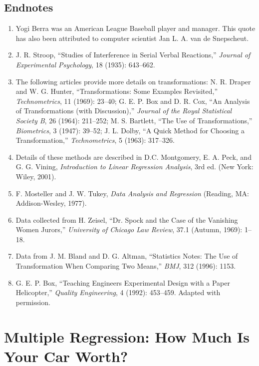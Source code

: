 \documentclass[
]{report}
\begin{document}
\section*{\texorpdfstring{\textbf{Endnotes}}{Endnotes}}\label{endnotes}

\begin{enumerate}
  \item Yogi Berra was an American League Baseball player and manager. This quote has also been attributed to computer scientist Jan L. A. van de Snepscheut.
  \item J. R. Stroop, “Studies of Interference in Serial Verbal Reactions,” \textit{Journal of Experimental Psychology}, 18 (1935): 643–662.
  \item The following articles provide more details on transformations: N. R. Draper and W. G. Hunter, “Transformations: Some Examples Revisited,” \textit{Technometrics}, 11 (1969): 23–40; G. E. P. Box and D. R. Cox, “An Analysis of Transformations (with Discussion),” \textit{Journal of the Royal Statistical Society B}, 26 (1964): 211–252; M. S. Bartlett, “The Use of Transformations,” \textit{Biometrics}, 3 (1947): 39–52; J. L. Dolby, “A Quick Method for Choosing a Transformation,” \textit{Technometrics}, 5 (1963): 317–326.
  \item Details of these methods are described in D.C. Montgomery, E. A. Peck, and G. G. Vining, \textit{Introduction to Linear Regression Analysis}, 3rd ed. (New York: Wiley, 2001).
  \item F. Mosteller and J. W. Tukey, \textit{Data Analysis and Regression} (Reading, MA: Addison-Wesley, 1977).
  \item Data collected from H. Zeisel, “Dr. Spock and the Case of the Vanishing Women Jurors,” \textit{University of Chicago Law Review}, 37.1 (Autumn, 1969): 1–18.
  \item Data from J. M. Bland and D. G. Altman, “Statistics Notes: The Use of Transformation When Comparing Two Means,” \textit{BMJ}, 312 (1996): 1153.
  \item G. E. P. Box, “Teaching Engineers Experimental Design with a Paper Helicopter,” \textit{Quality Engineering}, 4 (1992): 453–459. Adapted with permission.
\end{enumerate}

\chapter{Multiple Regression: How Much Is Your Car Worth?}\label{multiple-regression-how-much-is-your-car-worth}
\end{document}

